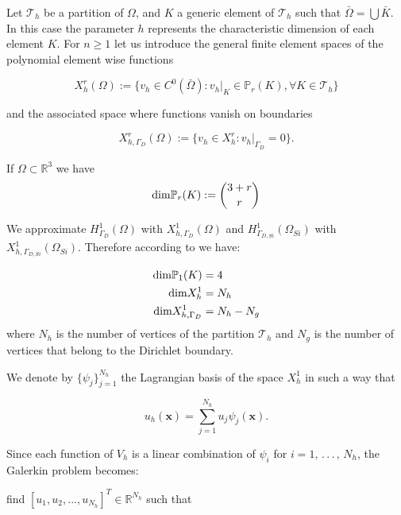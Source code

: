 Let $\mathcal{T}_h$ be a partition of $\Omega$, and $K$ a generic element of $\mathcal{T}_h$ such that  $\bar{\Omega} =  \bigcup \bar{K}$. In this case the parameter $h$ represents the characteristic dimension of each element $K$.
For $n\geq 1$ let us introduce the general finite element spaces of the polynomial element wise functions

\begin{equation}
X^r_h(\Omega) := \{v_h \in C^0(\bar{\Omega}): v_h|_K\in \mathbb{P}_r(K),\forall K \in \mathcal{T}_h \}
\end{equation}

and the associated space where functions vanish on boundaries

\begin{equation}
X^r_{h,\Gamma_D}(\Omega)  := \{ v_h \in X^r_h: v_h|_{\Gamma_D} = 0 \} .
\end{equation}

If $\Omega \subset \mathbb{R}^3$ we have
\begin{equation}
\small
\label{eq: dimensione polinomi}
{\rm dim}\mathbb{P}_r(K) := \binom {3+r} {r}
\end{equation}

We approximate $H^1_{\Gamma_D}(\Omega)$ with $X^1_{h,\Gamma_D}(\Omega)$ and $H^1_{\Gamma_{D,Si}}(\Omega_{Si})$ with $X^1_{h,\Gamma_{D,Si}}(\Omega_{Si})$. Therefore according to  we have:

\begin{align*}
{\rm dim} \mathbb{P}_1(K) & = 4 \\
{\rm dim} X^1_h & = N_h \\
{\rm dim} X^1_{h,\Gamma_D} & = N_h - N_g
\end{align*}
where $N_h$ is the number of vertices of the partition $\mathcal{T}_h$ and $N_g$ is the number of vertices that belong to the Dirichlet boundary.

We denote by $\{ \psi_j \}_{j=1}^{N_h} $ the Lagrangian basis of the space $X^1_{h}$ in such a way that


\begin{equation}
u_h(\mathbf{x}) = \sum_{j=1}^{N_h} u_j \psi_j(\mathbf{x}).
\end{equation}

Since each function of $V_h$ is a linear combination of $\psi_i$ for $i = 1, \, . \, . \, . \, , \, N_h$, the Galerkin problem  becomes:

find $[u_1,u_2,...,u_{N_h}]^T \in \mathbb{R}^{N_h}$ such that

